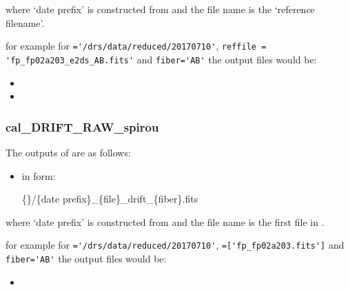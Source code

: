 \noindent where `date prefix' is constructed from \argnightname and the file name is the `reference filename'.


\noindent for example for \reduceddir\lstinline[style=pythoninline]|='/drs/data/reduced/20170710'|, \lstinline[style=pythoninline]|reffile = 'fp_fp02a203_e2ds_AB.fits'| and \lstinline[style=pythoninline]|fiber='AB'| the output files would be:
\begin{tcustomdir}
\begin{itemize}
\item {}
\item {}
\end{itemize}
\end{tcustomdir}

\subsubsection{cal\_DRIFT\_RAW\_spirou}

The outputs of \calDRIFTRAW are as follows:

\begin{itemize}

\item {} in form:
\begin{tcustomdir}
\{\reduceddir\}/\{date prefix\}\_\{file\}\_drift\_\{fiber\}.fits
\end{tcustomdir}

\end{itemize}


\noindent where `date prefix' is constructed from \argnightname and the file name is the first file in \argfilenames.


\noindent for example for \reduceddir\lstinline[style=pythoninline]|='/drs/data/reduced/20170710'|, \argfilenames\lstinline[style=pythoninline]|=['fp_fp02a203.fits']| and \lstinline[style=pythoninline]|fiber='AB'| the output files would be:
\begin{tcustomdir}
\begin{itemize}
\item {}
\end{itemize}
\end{tcustomdir}


